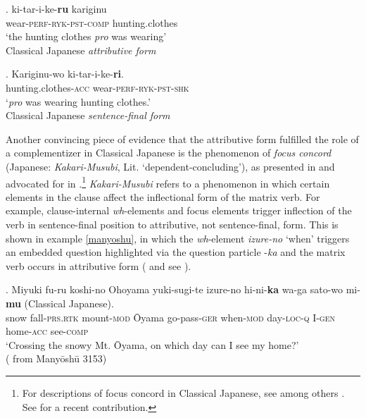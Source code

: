 \exg. ki-tar-i-ke-\textbf{ru} kariginu\\
wear-\textsc{perf-ryk-pst-comp} hunting.clothes\\
`the hunting clothes \textit{pro} was wearing' \\ \null \hfill Classical Japanese \textit{attributive form} \citep[32]{kaplan:1995:the} \label{keru original}

\exg. Kariginu-wo ki-tar-i-ke-\textbf{ri}.\\
hunting.clothes-\textsc{acc} wear-\textsc{perf-ryk-pst-shk}\\
`\textit{pro} was wearing hunting clothes.’ \\ \null \hfill Classical Japanese \textit{sentence-final form} \label{keru}

Another convincing piece of evidence that the attributive form fulfilled the role of a complementizer in  Classical Japanese is the phenomenon of \textit{focus concord} (Japanese: \textit{Kakari-Musubi}, Lit. `dependent-concluding’), as presented in \citet{kinsui:1995:iwayuru} and advocated for in \citet[§ 3.5]{hiraiwa:2005:dimensions}.\footnote{For descriptions of focus concord in Classical Japanese, see among others \citet{morishige:1971:nihon,funagi:1987:kakari}. See \citet{narrog:2019:origin} for a recent contribution.} \textit{Kakari-Musubi} refers to a phenomenon in which certain elements in the clause affect the inflectional form of the matrix verb. For example, clause-internal \textit{wh}-elements and focus elements trigger inflection of the verb in sentence-final position to attributive, not sentence-final, form. This is shown in example \ref{manyoshu}, in which the \textit{wh}-element \textit{izure-no} `when’ triggers an embedded question highlighted via the question particle -\textit{ka} and the matrix verb occurs in attributive form (\citealt[125–127]{hiraiwa:2005:dimensions} and see \citealt{nomura:1995:ka}).

\exg. Miyuki fu-ru koshi-no Ohoyama yuki-sugi-te izure-no hi-ni-\textbf{ka} wa-ga sato-wo mi-\textbf{mu} (Classical Japanese).\\
snow fall-\textsc{prs.rtk} mount-\textsc{mod} Ōyama go-pass-\textsc{ger} when-\textsc{mod} day-\textsc{loc-q} I-\textsc{gen} home-\textsc{acc} see-\textsc{comp}\\
`Crossing the snowy Mt. Ōyama, on which day can I see my home?' \\ \null \hfill (\citealt[125]{hiraiwa:2005:dimensions} from Manyōshū 3153) \label{manyoshu}


